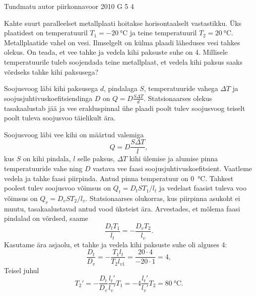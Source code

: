 {Tundmatu autor} %
{piirkonnavoor} %
{2010} %
{G 5} %
{4} %
{
\ifStatement
Kahte suurt paralleelset metallplaati hoitakse horisontaalselt vastastikku. Üks plaatidest on temperatuuril $T_1 = \SI{-20}{\celsius}$ ja teine temperatuuril $T_2 = \SI{20}{\celsius}$. Metallplaatide vahel on vesi. Ilmselgelt on külma plaadi läheduses vesi tahkes olekus. On teada, et vee tahke ja vedela kihi paksuste suhe on \num{4}. Millisele temperatuurile tuleb soojendada teine metallplaat, et vedela kihi paksus saaks võrdseks tahke kihi paksusega?
\fi


\ifHint
Soojusvoog läbi kihi paksusega $d$, pindalaga $S$, temperatuuride vahega $\Delta T$ ja soojusjuhtivuskoefitsiendinga $D$ on $Q = D\frac{S\Delta T}{d}$. Statsionaarses olekus tasakaalustab jää ja vee eralduspinnal ühe plaadi poolt tulev soojusvoog teiselt poolt tuleva soojusvoo täielikult ära. 
\fi


\ifSolution
Soojusvoog läbi vee kihi on määrtud valemiga
\[
Q = D\frac{S\Delta T}{l},
\]
kus $S$ on kihi pindala, $l$ selle paksus, $\Delta T$ kihi ülemise ja alumise pinna temperatuuride vahe ning $D$ vastava vee faasi soojusjuhtivuskoefitsient. Vaatleme vedela ja tahke faasi piirpinda. Antud pinna temperatuur on \SI{0}{\celsius}. Tahkest poolest tulev soojusvoo võimsus on
$Q_t = D_tST_1/l_t$
ja vedelast faasist tuleva voo võimsus on
$Q_v = D_vST_2/l_v$.
Statsionaarses olukorras, kus piirpinna asukoht ei muutu, tasakaalustavad antud vood üksteist ära. Arvestades, et mõlema faasi pindalad on võrdsed, saame
\[
\frac{D_tT_1}{l_t} = -\frac{D_vT_2}{l_v}.
\]
Kasutame ära asjaolu, et tahke ja vedela kihi paksuste suhe oli alguses \num{4}:
\[
\frac{D_t}{D_v} = -\frac{T_{1} l_{t}}{T_2 l_{v1}}=\frac{\num{20}\cdot \num{4}}{\num{-20}\cdot \num{1}} = \num{4},
\]
Teisel juhul
\[
T_{2}' = -\frac{D_{t}}{D_{v}}\frac{l_{t}'}{l_{v}'} T_1 = \num{-4}\frac{l_t'}{l_v'} T_2 = \SI{80}{\celsius}.
\]
\fi
}